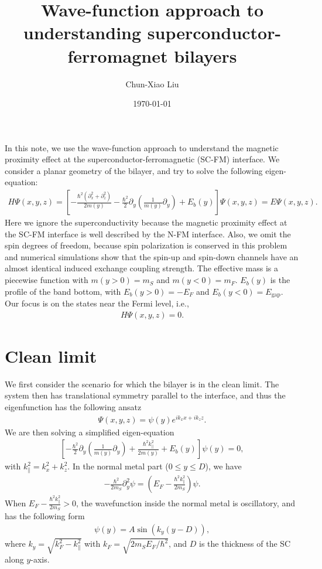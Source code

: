 \documentclass{article}
\begin{document}
\title{Wave-function approach to understanding superconductor-ferromagnet bilayers}
\author{Chun-Xiao Liu}
\date{\today}
\maketitle


In this note, we use the wave-function approach to understand the magnetic proximity effect at the superconductor-ferromagnetic (SC-FM) interface. We consider a planar geometry of the bilayer, and try to solve the following eigen-equation:
\begin{align}
H \Psi(x,y,z) = \left[ -\frac{\hbar^2 (\partial^2_x + \partial^2_z )}{2m(y)} - \frac{\hbar^2}{2} \partial_y \left( \frac{1}{m(y)} \partial_y \right) + E_b(y) \right] \Psi(x,y,z) = E \Psi(x,y,z).
\end{align}
Here we ignore the superconductivity because the magnetic proximity effect at the SC-FM interface is well described by the N-FM interface. Also, we omit the spin degrees of freedom, because spin polarization is conserved in this problem and numerical simulations show that the spin-up and spin-down channels have an almost identical induced exchange coupling strength. The effective mass is a piecewise function with $m(y>0) = m_S$ and $m(y<0) = m_F$. $E_b(y)$ is the profile of the band bottom, with $E_b(y>0) = -E_F$ and $E_b(y<0)=E_{\text{gap}}$. Our focus is on the states near the Fermi level, i.e.,
\begin{align}
H \Psi(x,y,z) =0.
\end{align}

\section{Clean limit}
We first consider the scenario for which the bilayer is in the clean limit. The system then has translational symmetry parallel to the interface, and thus the eigenfunction has the following ansatz
\begin{align}
\Psi(x,y,z) = \psi(y) e^{ik_x x +ik_z z }.
\end{align}
We are then solving a simplified eigen-equation
\begin{align}
\left[ - \frac{\hbar^2}{2} \partial_y \left( \frac{1}{m(y)} \partial_y \right) + \frac{\hbar^2 k^2_{\parallel}}{2m(y)} + E_b(y) \right] \psi(y) = 0,
\end{align}
with $k^2_{\parallel} = k^2_x + k^2_z$. In the normal metal part ($0 \leq y \leq D$), we have
\begin{align}
-\frac{\hbar^2}{2m_S}\partial^2_y \psi = \left( E_F - \frac{\hbar^2 k^2_{\parallel}}{2m_S} \right) \psi.
\end{align}
When $E_F - \frac{\hbar^2 k^2_{\parallel}}{2m_S} >0$, the wavefunction inside the normal metal is oscillatory, and has the following form
\begin{align}
\psi(y) = A \sin (k_y (y-D)),
\end{align}
where $k_y = \sqrt{ k^2_F - k^2_{\parallel} }$ with $k_F = \sqrt{2m_SE_F / \hbar^2}$, and $D$ is the thickness of the SC along $y$-axis.
\end{document}
